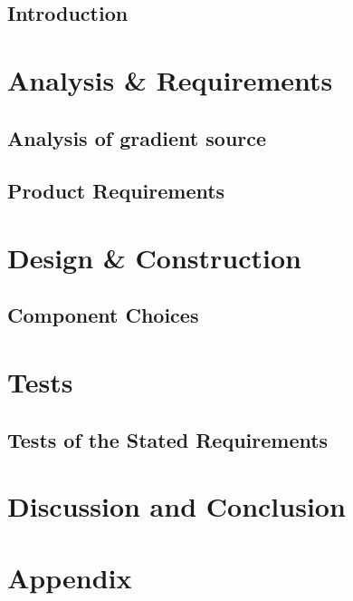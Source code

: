 \glsresetall
 \graphicspath{{figures/analysing/}}
\chapter{Introduction}

\part{Analysis \& Requirements}\label{pt:analysis} \glsresetall
 \graphicspath{{figures/analysing/}}
 \chapter{Analysis of gradient source}\label{ch:analysing}
% 
 

\chapter{Product Requirements}
%



\part{Design \& Construction}\label{pt:design} 
\graphicspath{{figures/design/}}
\chapter{Component Choices}
%


 \graphicspath{{figures/tests/}}
\part{Tests}\label{pt:tests}
\chapter{Tests of the Stated Requirements}
%


 
\part{Discussion and Conclusion}\label{pt:conclusions}
% 
%

\glsresetall
\appendix %

 \graphicspath{{figures/appendix/}}
\part{Appendix}\label{pt:appendix}
%
